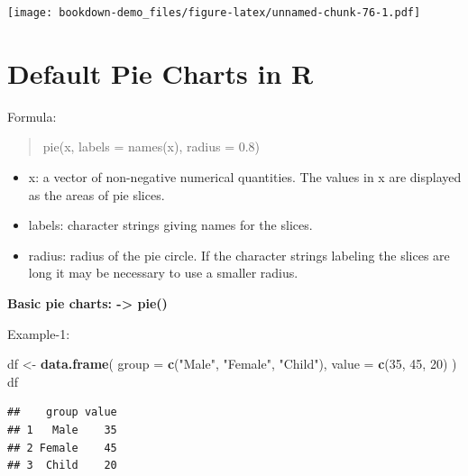 \documentclass[]{book}
\newenvironment{Shaded}{\begin{snugshade}}{\end{snugshade}}
\newcommand{\KeywordTok}[1]{\textcolor[rgb]{0.13,0.29,0.53}{\textbf{#1}}}
\newcommand{\DataTypeTok}[1]{\textcolor[rgb]{0.13,0.29,0.53}{#1}}
\newcommand{\DecValTok}[1]{\textcolor[rgb]{0.00,0.00,0.81}{#1}}
\newcommand{\StringTok}[1]{\textcolor[rgb]{0.31,0.60,0.02}{#1}}
\newcommand{\OperatorTok}[1]{\textcolor[rgb]{0.81,0.36,0.00}{\textbf{#1}}}
\newcommand{\NormalTok}[1]{#1}
\providecommand{\tightlist}{%
  \setlength{\itemsep}{0pt}\setlength{\parskip}{0pt}}
\begin{document}
\texttt{[image: bookdown-demo\_files/figure-latex/unnamed-chunk-76-1.pdf]}

\chapter{Default Pie Charts in R}\label{default-pie-charts-in-r}

Formula:

\begin{quote}
pie(x, labels = names(x), radius = 0.8)
\end{quote}

\begin{itemize}
\tightlist
\item
  x: a vector of non-negative numerical quantities. The values in x are
  displayed as the areas of pie slices.
\item
  labels: character strings giving names for the slices.
\item
  radius: radius of the pie circle. If the character strings labeling
  the slices are long it may be necessary to use a smaller radius.
\end{itemize}

\textbf{Basic pie charts: -\textgreater{} pie()}

Example-1:

\begin{Shaded}
\begin{Highlighting}[]
\NormalTok{df <-}\StringTok{ }\KeywordTok{data.frame}\NormalTok{(}
  \DataTypeTok{group =} \KeywordTok{c}\NormalTok{(}\StringTok{"Male"}\NormalTok{, }\StringTok{"Female"}\NormalTok{, }\StringTok{"Child"}\NormalTok{),}
  \DataTypeTok{value =} \KeywordTok{c}\NormalTok{(}\DecValTok{35}\NormalTok{, }\DecValTok{45}\NormalTok{, }\DecValTok{20}\NormalTok{)}
\NormalTok{  )}
\NormalTok{df}
\end{Highlighting}
\end{Shaded}

\begin{verbatim}
##    group value
## 1   Male    35
## 2 Female    45
## 3  Child    20
\end{verbatim}

\begin{Shaded}
\end{Shaded}
\end{document}
